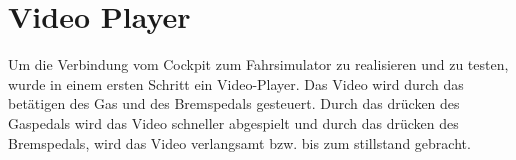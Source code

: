 \section{Video Player}
Um die Verbindung vom Cockpit zum Fahrsimulator zu realisieren und zu testen, wurde in einem ersten Schritt ein Video-Player. Das Video wird durch das betätigen des Gas und des Bremspedals gesteuert. Durch das drücken des Gaspedals wird das Video schneller abgespielt und durch das drücken des Bremspedals, wird das Video verlangsamt bzw. bis zum stillstand gebracht. 